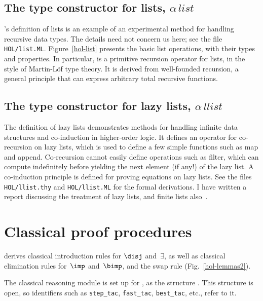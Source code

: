 \subsection{The type constructor for lists, $\alpha\,list$}
{\HOL}'s definition of lists is an example of an experimental method for
handling recursive data types.  The details need not concern us here; see
the file {\tt HOL/list.ML}.  Figure~\ref{hol-list} presents the
basic list operations, with their types and properties.  In particular,
 is a primitive recursion operator for lists, in the
style of Martin-L\"of type theory.  It is derived from well-founded
recursion, a general principle that can express arbitrary total recursive
functions. 


\subsection{The type constructor for lazy lists, $\alpha\,llist$}
The definition of lazy lists demonstrates methods for handling infinite
data structures and co-induction in higher-order logic.  It defines an
operator for co-recursion on lazy lists, which is used to define a few
simple functions such as map and append.  Co-recursion cannot easily define
operations such as filter, which can compute indefinitely before yielding
the next element (if any!) of the lazy list.  A co-induction principle is
defined for proving equations on lazy lists.  See the files
{\tt HOL/llist.thy} and {\tt HOL/llist.ML} for the formal
derivations.  I have written a report discussing the treatment of lazy
lists, and finite lists also~\cite{paulson-coind}.


\section{Classical proof procedures} \label{hol-cla-prover}
{\HOL} derives classical introduction rules for $\disj$ and~$\exists$, as
well as classical elimination rules for~$\imp$ and~$\bimp$, and the swap
rule (Fig.~\ref{hol-lemmas2}).

The classical reasoning module is set up for \HOL, as the structure 
.  This structure is open, so {\ML} identifiers such
as {\tt step_tac}, {\tt fast_tac}, {\tt best_tac}, etc., refer to it.

